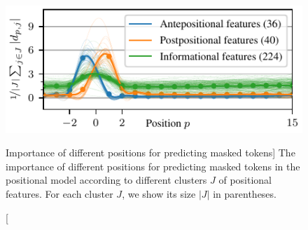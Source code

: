 \begin{figure}
\centering
\includegraphics[width=0.7\columnwidth]{positional-features}
\vspace{-0.2cm}
\caption
  [Importance of different positions for predicting masked tokens]%
  {The importance of different positions for predicting masked tokens in
   the positional model according to different clusters $J$ of positional
   features. For each cluster $J$, we show its size $|J|$ in parentheses.
   \cite[Figure 4]{novotny2021when}}
\protect{}
\protect{}
\protect{}
\label{fig:position-independent-token-embeddings-interpretability}
\end{figure}
